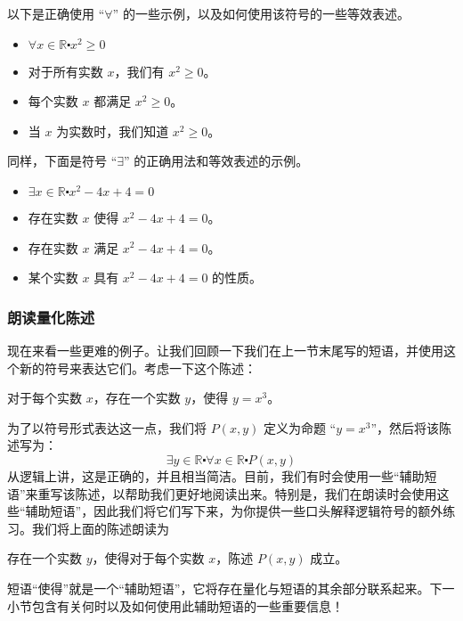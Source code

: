 \begin{example}
    以下是正确使用 ``$\forall$'' 的一些示例，以及如何使用该符号的一些等效表述。
    \begin{itemize}
        \item $\forall x \in \mathbb{R} \centerdot x^2 \ge 0$
        \item 对于所有实数 $x$，我们有 $x^2 \ge 0$。
        \item 每个实数 $x$ 都满足 $x^2 \ge 0$。
        \item 当 $x$ 为实数时，我们知道 $x^2 \ge 0$。
    \end{itemize}
    同样，下面是符号 ``$\exists$'' 的正确用法和等效表述的示例。
    \begin{itemize}
        \item $\exists x \in \mathbb{R} \centerdot x^2 - 4x + 4 = 0$
        \item 存在实数 $x$ 使得 $x^2 - 4x + 4 = 0$。
        \item 存在实数 $x$ 满足 $x^2 - 4x + 4 = 0$。
        \item 某个实数 $x$ 具有 $x^2 - 4x + 4 = 0$ 的性质。
    \end{itemize}
\end{example}

\subsubsection*{朗读量化陈述}

\begin{example}
    现在来看一些更难的例子。让我们回顾一下我们在上一节末尾写的短语，并使用这个新的符号来表达它们。考虑一下这个陈述：
    \begin{center}
        对于每个实数 $x$，存在一个实数 $y$，使得 $y = x^3$。
    \end{center}
    为了以符号形式表达这一点，我们将 $P(x, y)$ 定义为命题 ``$y = x^3$''，然后将该陈述写为：
    \[\exists y \in \mathbb{R} \centerdot \forall x \in \mathbb{R} \centerdot P(x, y)\]
    从逻辑上讲，这是正确的，并且相当简洁。目前，我们有时会使用一些``辅助短语''来重写该陈述，以帮助我们更好地阅读出来。特别是，我们在朗读时会使用这些``辅助短语''，因此我们将它们写下来，为你提供一些口头解释逻辑符号的额外练习。我们将上面的陈述朗读为
    \begin{center}
        存在一个实数 $y$，使得对于每个实数 $x$，陈述 $P(x, y)$ 成立。
    \end{center}
    短语``使得''就是一个``辅助短语''，它将存在量化与短语的其余部分联系起来。下一小节包含有关何时以及如何使用此辅助短语的一些重要信息！
\end{example}

